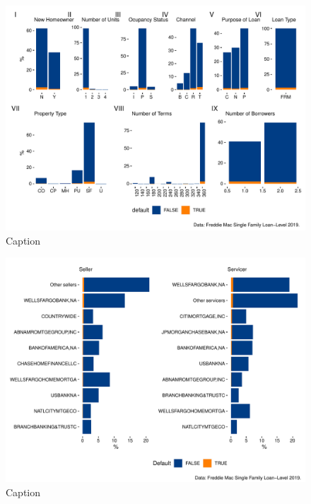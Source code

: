 \begin{figure}[H]
    \centering
    \includegraphics[width = \textwidth]{Figures/pw_4.pdf}
    \caption{Caption}
    \label{fig:my_label}
\end{figure}



\begin{figure}[H]
    \centering
    \includegraphics[width = \textwidth]{Figures/pw_6.pdf}
    \caption{Caption}
    \label{fig:my_label}
\end{figure}

